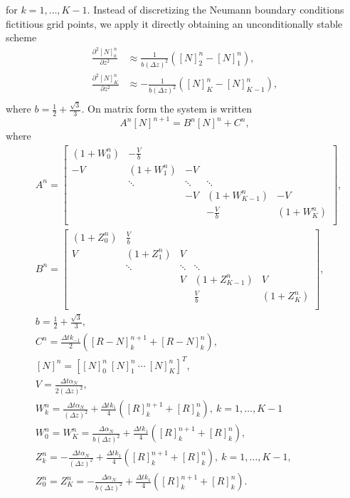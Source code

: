 \documentclass{article}
\begin{document}
for $k = 1, \hdots, K - 1$.
Instead of discretizing the Neumann boundary conditions fictitious grid points, we apply it directly obtaining an unconditionally stable scheme \cite{khaliq}
\begin{align*}
        \frac{\partial^2 [N]_0^{n}}{\partial z^2} &\approx \frac{1}{b (\Delta z)^2}([N]_2^n - [N]_1^n), \\
        \frac{\partial^2 [N]_K^{n}}{\partial z^2} &\approx -\frac{1}{b (\Delta z)^2}([N]_K^n - [N]_{K-1}^n), \\
\end{align*}
where $b = \frac{1}{2} + \frac{\sqrt{3}}{3}$.
On matrix form the system is written
\begin{equation}\label{eq:system}
        A^n[N]^{n+1} = B^n[N]^n + C^n,
\end{equation}
where
\begin{align*}
        &A^n =   
\begin{bmatrix}
        \left( 1 + W_0^n \right) & -\frac{V}{b} &   &  &  \\
        -V & \left(1 + W_1^n \right) & -V  &  &   \\
         & \ddots & \ddots & \ddots &    \\
         &  & -V & \left( 1 + W_{K-1}^n \right) & -V   \\
         &  &  &  -\frac{V}{b} & \left( 1 + W_K^n \right) \\
\end{bmatrix}
,\\
        &B^n = 
\begin{bmatrix}
        \left( 1 + Z_0^n \right) & \frac{V}{b} &   &  &  \\
        V & \left(1 + Z_1^n \right) & V  &  &   \\
         & \ddots & \ddots & \ddots &    \\
         &  & V & \left( 1 + Z_{K-1}^n \right) & V   \\
         &  &  &  \frac{V}{b} & \left( 1 + Z_K^n \right) \\
\end{bmatrix}
,\\
        &b = \frac{1}{2} + \frac{\sqrt{3}}{3}, \\
        &C^n= \frac{\Delta t k_{-1}}{2}([R-N]_k^{n+1} + [R-N]_k^n ) ,\\
        &[N]^n = [[N]_0^n \ [N]_1^n \ \cdots \ [N]_K^n]^T ,\\
        &V = \frac{\Delta t \alpha_N}{2(\Delta z)^2} ,\\
        &W_k^n = \frac{\Delta t \alpha_N}{(\Delta z)^2} + \frac{\Delta t k_1}{4}([R]_{k}^{n+1} + [R]_k^n), \ k = 1, \hdots, K - 1 \\
        &W_0^n = W_K^n = \frac{\Delta \alpha_N}{b(\Delta z)^2} + \frac{\Delta t k_1}{4}([R]_{k}^{n+1} + [R]_k^n),\\
        &Z_k^n = -\frac{\Delta t \alpha_N}{(\Delta z)^2} + \frac{\Delta t k_1}{4}([R]_{k}^{n+1} + [R]_k^n), \ k = 1, \hdots, K- 1, \\
        &Z_0^n = Z_K^n = -\frac{\Delta \alpha_N}{b(\Delta z)^2} + \frac{\Delta t k_1}{4}([R]_{k}^{n+1} + [R]_k^n).
\end{align*}
\end{document}
